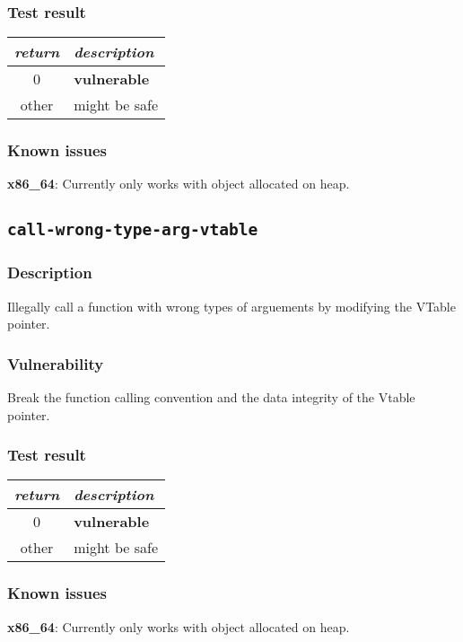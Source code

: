 \documentclass[a4paper]{book}
\begin{document}
\subsubsection{Test result}
\begin{tabular}{cl}
  \toprule
  \emph{return}  & \emph{description} \\
  \midrule
  0              & \textbf{vulnerable} \\
  other          & might be safe \\
  \bottomrule
\end{tabular}

\subsubsection{Known issues}

\textbf{x86\_64}: Currently only works with object allocated on heap.


\newpage
\subsection{\texttt{call-wrong-type-arg-vtable}}\label{test-call-wrong-type-arg-vtable}

\subsubsection{Description}
Illegally call a function with wrong types of arguements by modifying the VTable pointer.

\subsubsection{Vulnerability}
Break the function calling convention and the data integrity of the Vtable pointer.

\subsubsection{Test result}
\begin{tabular}{cl}
  \toprule
  \emph{return}  & \emph{description} \\
  \midrule
  0              & \textbf{vulnerable} \\
  other          & might be safe \\
  \bottomrule
\end{tabular}

\subsubsection{Known issues}
\textbf{x86\_64}: Currently only works with object allocated on heap.
\end{document}
